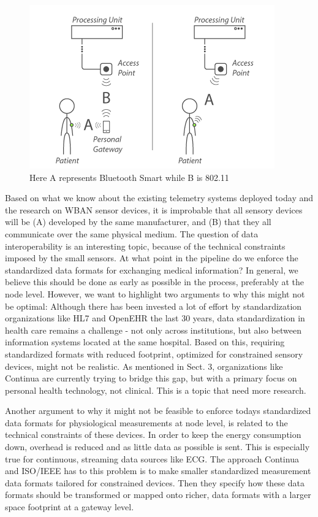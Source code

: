 \begin{figure}[H]
\centering
\includegraphics[scale=0.75]{img/figures/architecture.png}
\caption{Here A represents Bluetooth Smart while B is 802.11}
\label{fig:architecture}
\end{figure}

\noindent
Based on what we know about the existing telemetry systems deployed today and the research on WBAN sensor devices, it is improbable that all sensory devices will be (A) developed by the same manufacturer, and (B) that they all communicate over the same physical medium. The question of data interoperability is an interesting topic, because of the technical constraints imposed by the small sensors. At what point in the pipeline do we enforce the standardized data formats for exchanging medical information? In general, we believe this should be done as early as possible in the process, preferably at the node level. However, we want to highlight two arguments to why this might not be optimal: Although there has been invested a lot of effort by standardization organizations like HL7 and OpenEHR the last 30 years, data standardization in health care remains a challenge - not only across institutions, but also between information systems located at the same hospital. Based on this, requiring standardized formats with reduced footprint, optimized for constrained sensory devices, might not be realistic. As mentioned in Sect. 3, organizations like Continua are currently trying to bridge this gap, but with a primary focus on personal health technology, not clinical. This is a topic that need more research.

Another argument to why it might not be feasible to enforce todays standardized data formats for physiological measurements at node level, is related to the technical constraints of these devices. In order to keep the energy consumption down, overhead is reduced and as little data as possible is sent. This is especially true for continuous, streaming data sources like ECG. The approach Continua and ISO/IEEE has to this problem is to make smaller standardized measurement data formats tailored for constrained devices. Then they specify how these data formats should be transformed or mapped onto richer, data formats with a larger space footprint at a gateway level.


